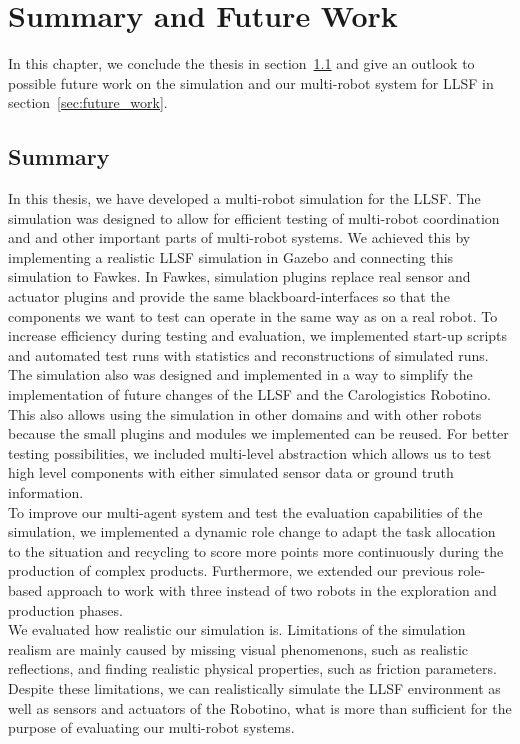 \chapter{Summary and Future Work}
\label{cha:summery_and_future_work}
In this chapter, we conclude the thesis in section~\ref{sec:summery} and give an outlook to possible future work on the simulation and our multi-robot system for LLSF in section~\ref{sec:future_work}.

\section{Summary}
\label{sec:summery}
In this thesis, we have developed a multi-robot simulation for the LLSF. The simulation was designed to allow for efficient testing of multi-robot coordination and and other important parts of multi-robot systems. We achieved this by implementing a realistic LLSF simulation in Gazebo and connecting this simulation to Fawkes. In Fawkes, simulation plugins replace real sensor and actuator plugins and provide the same blackboard-interfaces so that the components we want to test can operate in the same way as on a real robot. To increase efficiency during testing and evaluation, we implemented start-up scripts and automated test runs with statistics and reconstructions of simulated runs. The simulation also was designed and implemented in a way to simplify the implementation of future changes of the LLSF and the Carologistics Robotino. This also allows using the simulation in other domains and with other robots because the small plugins and modules we implemented can be reused. For better testing possibilities, we included multi-level abstraction which allows us to test high level components with either simulated sensor data or ground truth information. \\
To improve our multi-agent system and test the evaluation capabilities of the simulation, we implemented a dynamic role change to adapt the task allocation to the situation and recycling to score more points more continuously during the production of complex products. Furthermore, we extended our previous role-based approach to work with three instead of two robots in the exploration and production phases.\\
We evaluated how realistic our simulation is. Limitations of the simulation realism are mainly caused by missing visual phenomenons, such as realistic reflections, and finding realistic physical properties, such as friction parameters. Despite these limitations, we can realistically simulate the LLSF environment as well as sensors and actuators of the Robotino, what is more than sufficient for the purpose of evaluating our multi-robot systems.\\
